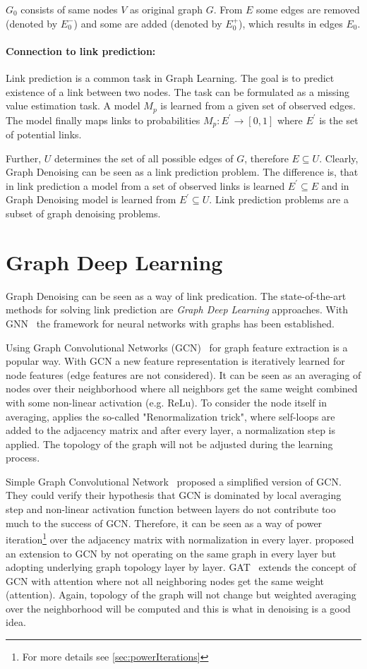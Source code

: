 $G_0$ consists of same nodes $V$ as original graph $G$. 
From $E$ some edges are removed (denoted by $E^{-}_0$) and some are added
(denoted by $E^{+}_0$), which results in edges $E_0$.

\paragraph{Connection to link prediction:}
Link prediction is a common task in Graph Learning. 
The goal is to predict existence of a link between two nodes.
The task can be formulated as a missing value estimation task. A model $M_p$ is learned
from a given set of observed edges. The model finally maps links to probabilities
$M_p : E^{\prime} \rightarrow [0,1]$ where $E^{\prime}$ is the set of potential links.

Further, $U$ determines the set of all possible edges of $G$, therefore $E \subseteq U$.
Clearly, Graph Denoising can be seen as a link prediction problem.
The difference is, that in link prediction a model from a set of observed links is learned
$E^{\prime} \subseteq E$ and in Graph Denoising model is learned from 
$E^{\prime} \subseteq U$. 
Link prediction problems are a subset of graph denoising problems.

\section{Graph Deep Learning}
\label{sec:graph_depp_learning}
Graph Denoising can be seen as a way of link predication. 
The state-of-the-art methods for solving link prediction are \textit{Graph Deep Learning} approaches.
With GNN~\cite{GNN} the framework for neural networks with graphs has been established. 

Using Graph Convolutional Networks (GCN)~\cite{GCN} for graph feature extraction is a popular way. 
With GCN a new feature representation is iteratively learned for node features (edge features are not considered).
It can be seen as an averaging of nodes over their neighborhood where all neighbors get the same weight combined with some non-linear activation (e.g. ReLu). 
To consider the node itself in averaging, \citet{GCN} applies the so-called "Renormalization trick", where self-loops are added to the 
adjacency matrix and after every layer, a normalization step is applied. 
The topology of the graph will not be adjusted during the learning process.

Simple Graph Convolutional Network~\cite{simpleGCN} proposed a simplified version of GCN.
They could verify their hypothesis that GCN is dominated by local averaging step and non-linear 
activation function between layers do not contribute too much to the success of GCN. 
Therefore, it can be seen as a way of power iteration\footnote{For more details see \ref{sec:powerIterations}}
over the adjacency matrix with normalization in every layer.
\citet{dynamicGCN} proposed an extension to GCN by not operating on the same graph in every layer but adopting
underlying graph topology layer by layer.
GAT~\cite{GAT} extends the concept of GCN with attention where not all neighboring nodes get the same weight (attention).
Again, topology of the graph will not change but weighted averaging over the neighborhood 
will be computed and this is what in denoising is a good idea.
